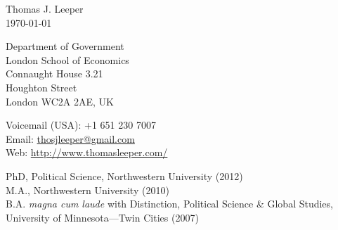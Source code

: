 \documentclass[12pt]{article}
\renewcommand{\section}[1]{\pagebreak[3]%
    \llap{\scshape\smash{\parbox[t]{\marginparwidth}{\raggedright {\color{lg}#1}}}}%
    \vspace{-\baselineskip}\par}
\newcommand{\entry}[1]{\indent {\color{lg}\guillemotright}\hspace{2pt}#1\vspace{.25em}\\}
\newcommand{\subentry}[1]{{\color{lg}-} #1\vspace{.25em}\\}
\begin{document}
{\LARGE Thomas J. Leeper}\\

\today\\

\begin{minipage}[b]{0.5\linewidth}
Department of Government\\
London School of Economics\\
Connaught House 3.21\\
Houghton Street\\
London WC2A 2AE, UK\\
\end{minipage}
\begin{minipage}[b]{0.5\linewidth}
Voicemail (USA): +1 651 230 7007\\
Email: \href{mailto:thosjleeper@gmail.com}{thosjleeper@gmail.com}\\
Web: \href{http://www.thomasleeper.com/}{http://www.thomasleeper.com/}\\
\end{minipage}

\section{Education}
\entry{PhD, Political Science, Northwestern University (2012)}
\entry{M.A., Northwestern University (2010)}
\entry{B.A. {\em magna cum laude} with Distinction, Political Science \& Global Studies, University of Minnesota---Twin Cities (2007)}
\end{document}
